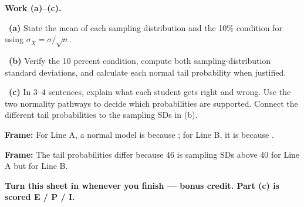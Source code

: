 \documentclass[11pt]{article}
\begin{document}
\newpage
\textbf{Work (a)--(c).}\par\smallskip

~\textbf{(a)} State the mean of each sampling distribution and the 10\% condition for using $\sigma_{\bar X}=\sigma/\sqrt n$.\par
\workspace{0.7in}

~\textbf{(b)} Verify the 10 percent condition, compute both sampling-distribution standard deviations, and calculate each normal tail probability when justified.\par
\workspace{1.4in}

~\textbf{(c)} In 3--4 sentences, explain what each student gets right and wrong. Use the two normality pathways to decide which probabilities are supported. Connect the different tail probabilities to the sampling SDs in (b).\par
\workspace{2.0in}

\begin{sentenceframebox}\raggedright\textbf{Frame:} For Line A, a normal model is \blank[0.8in] because \blank[1.6in]; for Line B, it is \blank[0.8in] because \blank[1.6in].\end{sentenceframebox}

\begin{sentenceframebox}\raggedright\textbf{Frame:} The tail probabilities differ because 46 is \blank[0.7in] sampling SDs above 40 for Line A but \blank[0.7in] for Line B.\end{sentenceframebox}

\textbf{Turn this sheet in whenever you finish --- bonus credit. Part (c) is scored E / P / I.}\par
\end{document}
